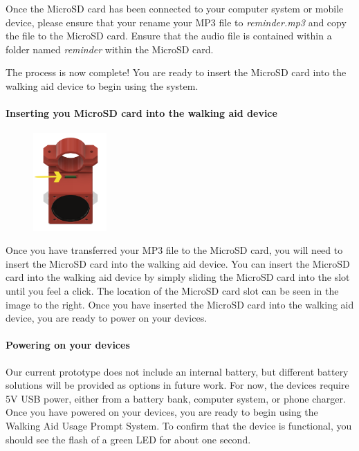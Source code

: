 				Once the MicroSD card has been connected to your computer system or mobile device, please ensure that your rename your MP3 file to \textit{reminder.mp3} and copy the file to the MicroSD card. Ensure that the audio file is contained within a folder named \textit{reminder} within the MicroSD card.

				The process is now complete! You are ready to insert the MicroSD card into the walking aid device to begin using the system.

				\paragraph{Inserting you MicroSD card into the walking aid device}\mbox{}

				\begin{figure}
					\vspace{-3.5em}
					\centering
					\includegraphics[width=0.25\textwidth]{graphics/sd_arrow.png}
				\end{figure}

				Once you have transferred your MP3 file to the MicroSD card, you will need to insert the MicroSD card into the walking aid device. You can insert the MicroSD card into the walking aid device by simply sliding the MicroSD card into the slot until you feel a click. The location of the MicroSD card slot can be seen in the image to the right. Once you have inserted the MicroSD card into the walking aid device, you are ready to power on your devices.

				\paragraph{Powering on your devices}\mbox{}

				Our current prototype does not include an internal battery, but different battery solutions will be provided as options in future work. For now, the devices require 5V USB power, either from a battery bank, computer system, or phone charger. Once you have powered on your devices, you are ready to begin using the Walking Aid Usage Prompt System. To confirm that the device is functional, you should see the flash of a green LED for about one second.

